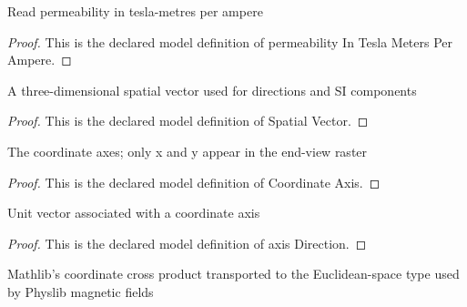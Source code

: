 \begin{definition}
  \label{def:physics:phyx-mini-0964:phyxminiproblems-problemphyxmini0964-permeabilityinteslametersperampere}
  Read permeability in tesla-metres per ampere
\end{definition}
\begin{proof}
  This is the declared model definition of permeability In Tesla Meters Per Ampere.
\end{proof}
\begin{definition}
  \label{def:physics:phyx-mini-0964:phyxminiproblems-problemphyxmini0964-spatialvector}
  A three-dimensional spatial vector used for directions and SI components
\end{definition}
\begin{proof}
  This is the declared model definition of Spatial Vector.
\end{proof}
\begin{definition}
  \label{def:physics:phyx-mini-0964:phyxminiproblems-problemphyxmini0964-coordinateaxis}
  The coordinate axes; only x and y appear in the end-view raster
\end{definition}
\begin{proof}
  This is the declared model definition of Coordinate Axis.
\end{proof}
\begin{definition}
  \label{def:physics:phyx-mini-0964:phyxminiproblems-problemphyxmini0964-axisdirection}
  Unit vector associated with a coordinate axis
\end{definition}
\begin{proof}
  This is the declared model definition of axis Direction.
\end{proof}
\begin{definition}
  \label{def:physics:phyx-mini-0964:phyxminiproblems-problemphyxmini0964-spatialcrossproduct}
  Mathlib's coordinate cross product transported to the Euclidean-space type used by Physlib magnetic fields
\end{definition}
